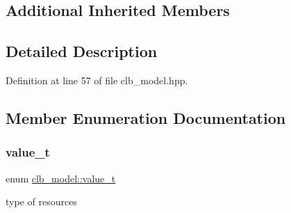 \subsection*{Additional Inherited Members}


\subsection{Detailed Description}


Definition at line 57 of file clb\+\_\+model.\+hpp.



\subsection{Member Enumeration Documentation}
\mbox{\label{classclb__model_a11a81df139e5752535807c276badbe21}} 
\subsubsection{\texorpdfstring{value\+\_\+t}{value\_t}}
{\footnotesize\ttfamily enum \hyperlink{classclb__model_a11a81df139e5752535807c276badbe21}{clb\+\_\+model\+::value\+\_\+t}}



type of resources 

